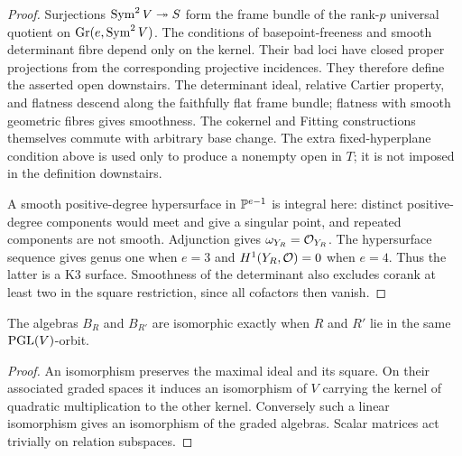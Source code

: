 \begin{proof}
Surjections $\operatorname{Sym}^2V\twoheadrightarrow S$ form the frame bundle of
the rank-$p$ universal quotient on $\operatorname{Gr}(e,\operatorname{Sym}^2V)$. The conditions
of basepoint-freeness and smooth determinant fibre depend only on the
kernel. Their bad loci have closed proper projections from the
corresponding projective incidences. They therefore define the asserted
open downstairs. The determinant ideal, relative Cartier property,
and flatness descend along the faithfully flat frame bundle; flatness
with smooth geometric fibres gives smoothness. The cokernel and
Fitting constructions themselves commute with arbitrary base change.
The extra fixed-hyperplane condition above is used only to produce a
nonempty open in $T$; it is not imposed in the definition downstairs.

A smooth positive-degree hypersurface in $\mathbb P^{e-1}$ is integral here:
distinct positive-degree components would meet and give a singular
point, and repeated components are not smooth. Adjunction gives
$\omega_{Y_R}=\mathcal O_{Y_R}$. The hypersurface sequence gives genus one
when $e=3$ and $H^1(Y_R,\mathcal O)=0$ when $e=4$. Thus the latter is a K3
surface. Smoothness of the determinant also excludes corank at least
two in the square restriction, since all cofactors then vanish.
\end{proof}

\begin{lemma}\label{lem:algebra-orbits}
The algebras $B_R$ and $B_{R'}$ are isomorphic exactly when $R$ and
$R'$ lie in the same $\operatorname{PGL}(V)$-orbit.
\end{lemma}
\begin{proof}
An isomorphism preserves the maximal ideal and its square. On their
associated graded spaces it induces an isomorphism of $V$ carrying
the kernel of quadratic multiplication to the other kernel. Conversely
such a linear isomorphism gives an isomorphism of the graded algebras.
Scalar matrices act trivially on relation subspaces.
\end{proof}
